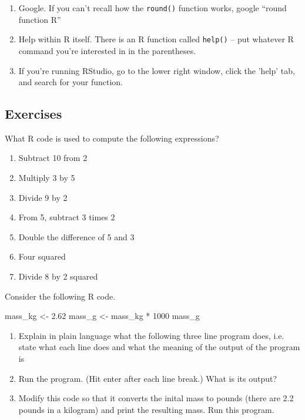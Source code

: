 \begin{enumerate}
\item Google.  If you can't recall how the \texttt{round()} function
  works, google ``round function R''
\item Help within R itself.  There is an R function called \texttt{help()} -- put whatever R command you're interested in in the parentheses.
\item If you're running RStudio, go to the lower right window, click the
  'help' tab, and search for your function.
\end{enumerate}

\subsection{Exercises}

\begin{q}
  What R code is used to compute the following expressions?
  \begin{enumerate}
  \item Subtract 10 from 2 
  \item Multiply 3 by 5
  \item Divide 9 by 2
  \item From 5, subtract 3 times 2
  \item Double the difference of 5 and 3
  \item Four squared
  \item Divide 8 by 2 squared
  \end{enumerate}
\end{q} 


\begin{q}
  Consider the following R code.

\begin{rcode}
mass_kg <- 2.62 
mass_g <- mass_kg * 1000 
mass_g 
\end{rcode}

\begin{enumerate}
\item Explain in plain language what the following three line program
  does, i.e. state what each line does and what the meaning of the
  output of the program is
\item  Run the program. (Hit enter after each line break.) What is its output?  
\item  Modify this code so that it converts the inital mass to pounds (there are 2.2
  pounds in a kilogram) and print the resulting mass.  Run this
  program.
\end{enumerate} 
\end{q} 

